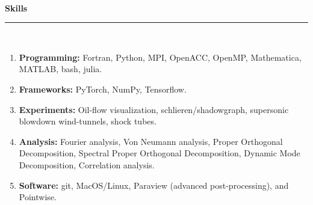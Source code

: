\ \\[2mm]
\noindent \textbf{\large{Skills}}\\[-2.5mm]
\noindent\rule{\textwidth}{0.4pt} \\[-5mm]
\begin{enumerate}[itemsep=-1mm]
    \item \textbf{Programming:} Fortran, Python, MPI, OpenACC, OpenMP, Mathematica, MATLAB, bash, julia.
    \item \textbf{Frameworks:} PyTorch, NumPy, Tensorflow.
    \item \textbf{Experiments:} Oil-flow visualization, schlieren/shadowgraph, supersonic blowdown wind-tunnels, shock tubes.
    \item \textbf{Analysis:} Fourier analysis, Von Neumann analysis, Proper Orthogonal Decomposition, Spectral Proper Orthogonal Decomposition, Dynamic Mode Decomposition, Correlation analysis. 
    \item \textbf{Software:} git, MacOS/Linux, Paraview (advanced post-processing), and Pointwise.
\end{enumerate}



